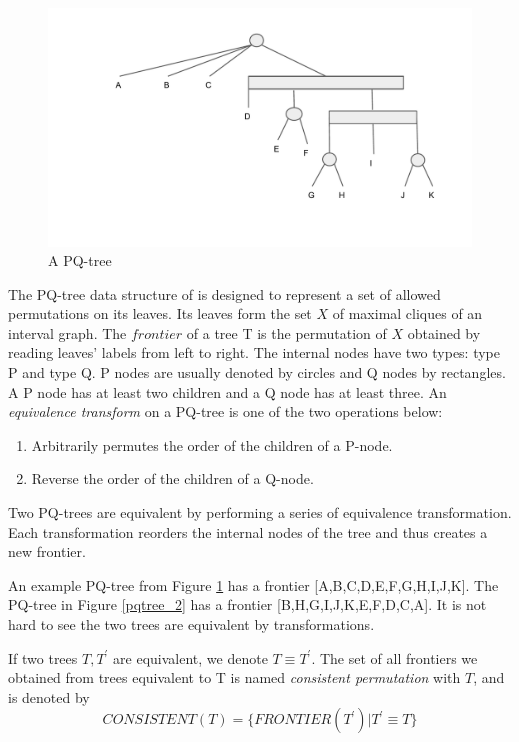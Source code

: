 \begin{figure}[H]
\centering
\includegraphics[width=12cm]{figures/pqtree_1.pdf}
\caption{A PQ-tree}
\label{pqtree_1}
\end{figure}

The PQ-tree data structure of is designed to represent a set of allowed permutations on its leaves. Its leaves form the set $X$ of maximal cliques of an interval graph. 
The $frontier$ of a tree T is the permutation of $X$ obtained by reading leaves' labels from left to right. The internal nodes have two types: type P and type Q. P nodes are usually denoted by circles and Q nodes by rectangles. A P node has at least two children and a Q node has at least three.
An \emph{equivalence transform} on a PQ-tree is one of the two operations below:

\begin{enumerate}
\item Arbitrarily permutes the order of the children of a P-node.
\item Reverse the order of the children of a Q-node.
\end{enumerate}

Two PQ-trees are equivalent by performing a series of equivalence transformation. Each transformation reorders the internal nodes of the tree and thus creates a new frontier. 

An example PQ-tree from Figure \ref{pqtree_1} has a frontier [A,B,C,D,E,F,G,H,I,J,K]. The PQ-tree in Figure \ref{pqtree_2} has a frontier [B,H,G,I,J,K,E,F,D,C,A]. It is not hard to see the two trees are equivalent by transformations. 

If two trees $T, T^{'}$ are equivalent, we denote $T \equiv T^{'}$. The set of all frontiers we obtained from trees equivalent to T is named \emph{consistent permutation} with $T$, and is denoted by $$CONSISTENT(T) = \{FRONTIER(T^{'})| T^{'} \equiv T \}$$

